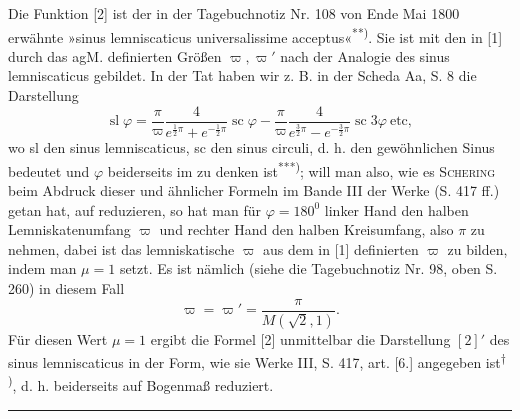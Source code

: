 \begingroup
\makeatletter\tagsleft@true\let\veqno\@@leqno\makeatother
{}
\begin{center}\end{center}
\par\indent Die Funktion [2] ist der in der Tagebuchnotiz Nr. 108 von Ende Mai 1800 erwähnte »sinus lemniscaticus universalissime acceptus«\textsuperscript{**)}. Sie ist mit den in [1] durch das agM. definierten Größen $\varpi,\varpi'$ nach der Analogie des sinus lemniscaticus gebildet. In der Tat haben wir z. B. in der Scheda Aa, S. 8 die Darstellung
\begin{equation*}\tag*{$[2]'$}\operatorname{sl}\varphi=\frac\pi\varpi\frac4{e^{\frac12\pi}+e^{-\frac12\pi}}\operatorname{sc}\varphi-\frac\pi\varpi\frac4{e^{\frac32\pi}-e^{-\frac32\pi}}\operatorname{sc}3\varphi\ \text{etc},\end{equation*}
\noindent wo sl den sinus lemniscaticus, sc den sinus circuli, d. h. den gewöhnlichen Sinus bedeutet und $\varphi$ beiderseits im  zu denken ist\textsuperscript{***)}; will man also, wie es \textsc{Schering} beim Abdruck dieser und ähnlicher Formeln im Bande III der Werke (S. 417 ff.) getan hat, auf  reduzieren, so hat man für $\varphi=180^0$ linker Hand den halben Lemniskatenumfang $\varpi$ und rechter Hand den halben Kreisumfang, also $\pi$ zu nehmen, dabei ist das lemniskatische $\varpi$ aus dem in [1] definierten $\varpi$ zu bilden, indem man $\mu=1$ setzt. Es ist nämlich (siehe die Tagebuchnotiz Nr. 98, oben S. 260) in diesem Fall
\begin{equation*}\tag*{$[1]'$}\varpi=\varpi'=\frac\pi{M(\surd2,1)}.\end{equation*}
\noindent Für diesen Wert $\mu=1$ ergibt die Formel [2] unmittelbar die Darstellung $[2]'$ des sinus lemniscaticus in der Form, wie sie Werke III, S. 417, art. [6.] angegeben ist\textsuperscript{\(\dagger\))}, d. h. beiderseits auf Bogenmaß reduziert.
\par\smallskip\noindent\rule{.25\linewidth}{.4pt}\par
